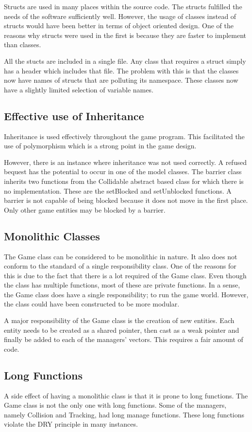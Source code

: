 \documentclass[10pt,twocolumn]{witseiepaper}
\begin{document}
Structs are used in many places within the source code. The structs fulfilled the needs of the software sufficiently well. However, the usage of classes instead of structs would have been better in terms of object oriented design. One of the reasons why structs were used in the first is because they are faster to implement than classes.

All the stucts are included in a single file. Any class that requires a struct simply has a header which includes that file. The problem with this is that the classes now have names of structs that are polluting its namespace. These classes now have a slightly limited selection of variable names.

\subsection{Effective use of Inheritance}
Inheritance is used effectively throughout the game program. This facilitated the use of polymorphism which is a strong point in the game design.

However, there is an instance where inheritance was not used correctly. A refused bequest has the potential to occur in one of the model classes. The barrier class inherits two functions from the Collidable abstract based class for which there is no implementation. These are the setBlocked and setUnblocked functions. A barrier is not capable of being blocked because it does not move in the first place. Only other game entities may be blocked by a barrier.

\subsection{Monolithic Classes}
The Game class can be considered to be monolithic in nature. It also does not conform to the standard of a single responsibility class. One of the reasons for this is due to the fact that there is a lot required of the Game class. Even though the class has multiple functions, most of these are private functions. In a sense, the Game class does have a single responsibility; to run the game world. However, the class could have been constructed to be more modular.

A major responsibility of the Game class is the creation of new entities. Each entity needs to be created as a shared pointer, then cast as a weak pointer and finally be added to each of the managers' vectors. This requires a fair amount of code. 

\subsection{Long Functions}
A side effect of having a monolithic class is that it is prone to long functions. The Game class is not the only one with long functions. Some of the managers, namely Collision and Tracking, had long manage functions. These long functions violate the DRY principle in many instances.
\end{document}
